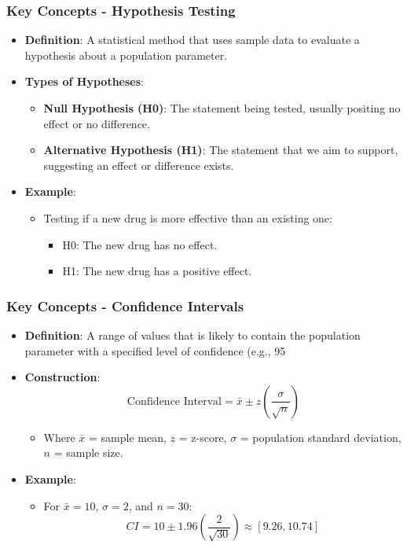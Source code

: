 \documentclass{beamer}
\begin{document}
\begin{frame}[fragile]
    \frametitle{Key Concepts - Hypothesis Testing}
    \begin{itemize}
        \item \textbf{Definition}: A statistical method that uses sample data to evaluate a hypothesis about a population parameter.
        \item \textbf{Types of Hypotheses}:
        \begin{itemize}
            \item \textbf{Null Hypothesis (H0)}: The statement being tested, usually positing no effect or no difference.
            \item \textbf{Alternative Hypothesis (H1)}: The statement that we aim to support, suggesting an effect or difference exists.
        \end{itemize}
        \item \textbf{Example}: 
        \begin{itemize}
            \item Testing if a new drug is more effective than an existing one:
            \begin{itemize}
                \item H0: The new drug has no effect.
                \item H1: The new drug has a positive effect.
            \end{itemize}
        \end{itemize}
    \end{itemize}
\end{frame}

\begin{frame}[fragile]
    \frametitle{Key Concepts - Confidence Intervals}
    \begin{itemize}
        \item \textbf{Definition}: A range of values that is likely to contain the population parameter with a specified level of confidence (e.g., 95%
        \item \textbf{Construction}:
        \begin{equation}
            \text{Confidence Interval} = \bar{x} \pm z \left( \frac{\sigma}{\sqrt{n}} \right)
        \end{equation}
        \begin{itemize}
            \item Where \( \bar{x} \) = sample mean, \( z \) = z-score, \( \sigma \) = population standard deviation, \( n \) = sample size.
        \end{itemize}
        \item \textbf{Example}:
        \begin{itemize}
            \item For \( \bar{x} = 10 \), \( \sigma = 2 \), and \( n = 30 \):
            \begin{equation}
                CI = 10 \pm 1.96 \left( \frac{2}{\sqrt{30}} \right) \approx [9.26, 10.74]
            \end{equation}
        \end{itemize}
    \end{itemize}
\end{frame}
\end{document}
